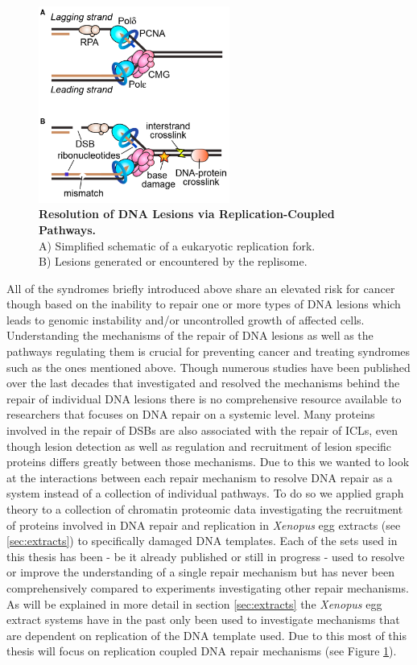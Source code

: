 \begin{figure}
    \includegraphics[width=0.56\textwidth]{resources/images/Intro/replicationfork.png}
    \caption[Resolution of DNA Lesions via Replication-Coupled Pathways]{\textbf{Resolution of DNA Lesions via Replication-Coupled Pathways.}\\A) Simplified schematic of a eukaryotic replication fork.\\B) Lesions generated or encountered by the replisome.\\\citep{Cortez.2019}}
    \label{fig:replicationfork}
\end{figure}
All of the syndromes briefly introduced above share an elevated risk for cancer though based on the inability to repair one or more types of DNA lesions which leads to genomic instability and/or uncontrolled growth of affected cells. Understanding the mechanisms of the repair of DNA lesions as well as the pathways regulating them is crucial for preventing cancer and treating syndromes such as the ones mentioned above. Though numerous studies have been published over the last decades that investigated and resolved the mechanisms behind the repair of individual DNA lesions there is no comprehensive resource available to researchers that focuses on DNA repair on a systemic level. Many proteins involved in the repair of DSBs are also associated with the repair of ICLs, even though lesion detection as well as regulation and recruitment of lesion specific proteins differs greatly between those mechanisms. Due to this we wanted to look at the interactions between each repair mechanism to resolve DNA repair as a system instead of a collection of individual pathways. To do so we applied graph theory to a collection of chromatin proteomic data investigating the recruitment of proteins involved in DNA repair and replication in \textit{Xenopus} egg extracts (see \ref{sec:extracts}) to specifically damaged DNA templates. Each of the sets used in this thesis has been - be it already published or still in progress - used to resolve or improve the understanding of a single repair mechanism but has never been comprehensively compared to experiments investigating other repair mechanisms. As will be explained in more detail in section \ref{sec:extracts} the \textit{Xenopus} egg extract systems have in the past only been used to investigate mechanisms that are dependent on replication of the DNA template used. Due to this most of this thesis will focus on replication coupled DNA repair mechanisms (see Figure \ref{fig:replicationfork}).

